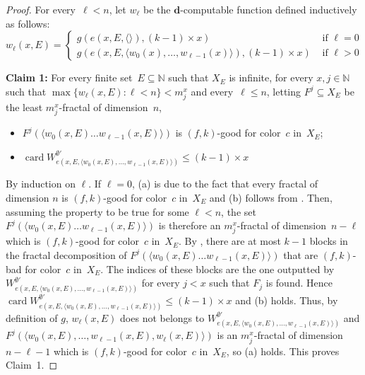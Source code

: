 \documentclass{article}
\numberwithin{theorem}{section}
\newcommand{\dbf}{\mathbf{d}}
\newcommand{\NN}[0]{\mathbb{N}}
\newcommand{\card}{\operatorname{card}}
\begin{document}
\begin{proof}
For every~$\ell < n$, let $w_\ell$ be the $\dbf$-computable function defined inductively as follows:
$$
w_\ell(x, E) = \begin{cases}
    g(e(x, E, \langle\rangle), (k-1) \times x) & \mbox{ if } \ell = 0\\
    g(e(x, E, \langle w_0(x), \dots, w_{\ell-1}(x)\rangle), (k-1) \times x) & \mbox{ if } \ell > 0
\end{cases}
$$
\smallskip

\textbf{Claim 1:} For every finite set~$E \subseteq \NN$ such that $X_E$ is infinite, for every $x, j \in \NN$ such that  $\max \{ w_\ell(x, E) : \ell < n\}< m_j^x$ and every~$\ell \leq n$,
letting $F^j \subseteq X_E$ be the least $m^x_j$-fractal of dimension~$n$,
\begin{itemize}
    \item[(a)] $F^j(\langle w_0(x, E) \dots w_{\ell-1}(x, E)\rangle)$ is $(f,k)$-good for color~$c$ in~$X_E$;
    \item[(b)] $\card W^{\emptyset'}_{e(x, E, \langle w_0(x,E), \dots, w_{\ell-1}(x,E) \rangle)} \leq (k-1) \times x$
\end{itemize}
By induction on $\ell$. If $\ell = 0$, (a) is due to the fact that every fractal of dimension $n$ is $(f,k)$-good for color~$c$ in~$X_E$ and (b) follows from . Then, assuming the property to be true for some $\ell < n$, the set $F^j(\langle w_0(x, E) \dots w_{\ell-1}(x, E)\rangle)$ is therefore an $m^x_j$-fractal of dimension~$n-\ell$ which is $(f, k)$-good for color~$c$ in~$X_E$. By , there are at most $k-1$ blocks in the fractal decomposition of $F^j(\langle w_0(x, E) \dots w_{\ell-1}(x, E)\rangle)$ that are $(f,k)$-bad for color~$c$ in~$X_E$. The indices of these blocks are the one outputted by $W^{\emptyset'}_{e(x, E, \langle w_0(x,E), \dots, w_{\ell-1}(x,E) \rangle)}$ for every $j < x$ such that $F_j$ is found. Hence $\card W^{\emptyset'}_{e(x, E, \langle w_0(x,E), \dots, w_{\ell-1}(x,E) \rangle)} \leq (k-1) \times x$ and (b) holds. Thus, by definition of $g$, $w_{\ell}(x,E)$ does not belongs to $W^{\emptyset'}_{e(x, E, \langle w_0(x,E), \dots, w_{\ell-1}(x,E) \rangle)}$ and $F^j(\langle w_0(x, E), \dots, w_{\ell-1}(x, E), w_{\ell}(x,E)\rangle)$ is an $m^x_j$-fractal of dimension~$n-\ell-1$ which is $(f,k)$-good for color~$c$ in~$X_E$, so (a) holds.
This proves Claim~1.
\smallskip


\end{proof}
\end{document}
